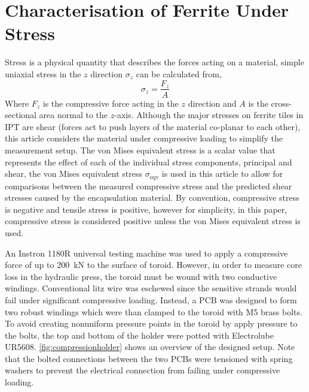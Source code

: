 \documentclass[conference]{IEEEtran}
\begin{document}
\section{Characterisation of Ferrite Under Stress}
Stress is a physical quantity that describes the forces acting on a material, simple uniaxial stress in the $z$ direction $\sigma_z$ can be calculated from, 
\begin{equation}
  \sigma_z = \frac{F_z}{A}
\end{equation}
Where $F_z$ is the compressive force acting in the $z$ direction and $A$ is the cross-sectional area normal to the $z$-axis. 
Although the major stresses on ferrite tiles in IPT are shear (forces act to push layers of the material co-planar to each other), this article considers the material under compressive loading to simplify the measurement setup. 
The von Mises equivalent stress is a scalar value that represents the effect of each of the individual stress components, principal and shear, the von Mises equivalent stress $\sigma_\text{eqv}$ is used in this article to allow for comparisons between the measured compressive stress and the predicted shear stresses caused by the encapsulation material. 
By convention, compressive stress is negative and tensile stress is positive, however for simplicity, in this paper, compressive stress is considered positive unless the von Mises equivalent stress is used. 

An Instron 1180R universal testing machine was used to apply a compressive force of up to \SI{200}{\kilo\newton} to the surface of toroid. 
However, in order to measure core loss in the hydraulic press, the toroid must be wound with two conductive windings. 
Conventional litz wire was eschewed since the sensitive strands would fail under significant compressive loading. 
Instead, a PCB was designed to form two robust windings which were than clamped to the toroid with M5 brass bolts. 
To avoid creating nonuniform pressure points in the toroid by apply pressure to the bolts, the top and bottom of the holder were potted with Electrolube UR5608. 
\cref{fig:compressionholder} shows an overview of the designed setup. 
Note that the bolted connections between the two PCBs were tensioned with spring washers to prevent the electrical connection from failing under compressive loading. 
\end{document}

